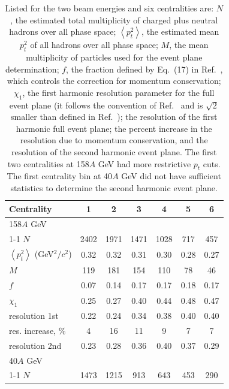 \documentclass[aps,prc,superscriptaddress,showpacs,floatfix,nofootinbib]{revtex4}
\newcommand{\mean}[1]{\left\langle #1 \right\rangle}
\begin{document}
\begin{table}[hbt!]
\caption {Listed for the two beam energies and six centralities are: 
$N$, the estimated total multiplicity of charged plus neutral hadrons
over all phase space; $\mean{p_t^2}$, the estimated mean $p_t^2$ of
all hadrons over all phase space; $M$, the mean multiplicity of
particles used for the event plane determination; $f$, the fraction
defined by Eq.~(17) in Ref.~\cite{Borghini:2002mv}, which controls the
correction for momentum conservation; $\chi_1$, the first harmonic
resolution parameter for the full event plane (it follows the
convention of Ref.~\cite{Ollitrault:ba} and is $\sqrt{2}$ smaller than
defined in Ref.~\cite{Poskanzer:1998yz}); the resolution of the first
harmonic full event plane; the percent increase in the resolution due
to momentum conservation, and the resolution of the second harmonic
event plane. The first two centralities at 158$A$ GeV had more
restrictive $p_t$ cuts. The first centrality bin at 40$A$ GeV did
not have sufficient statistics to determine the second harmonic event
plane.}
\begin{center}
\begin{ruledtabular}
\begin{tabular}{l|c|c|c|c|c|c}
Centrality              & 1     & 2     & 3     & 4     & 5     & 6     \\ \hline
158$A$ GeV              & & & & & & \\ \cline{1-1}
$N$                     & 2402  & 1971  & 1471  & 1028  & 717   & 457   \\
$\mean{p_t^2}$ (GeV$^2/c^2$)  
                        & 0.32  & 0.32  & 0.31  & 0.30  & 0.28  & 0.27  \\
$M$                     & 119   & 181   & 154   & 110   & 78    & 46    \\
$f$                     & 0.07  & 0.14  & 0.17  & 0.17  & 0.18  & 0.17  \\
$\chi_1$                & 0.25  & 0.27  & 0.40  & 0.44  & 0.48  & 0.47  \\
resolution 1st          & 0.22  & 0.24  & 0.34  & 0.38  & 0.40  & 0.40  \\
res. increase, \%       & 4     & 16    & 11    & 9     & 7     & 7   \\ 
resolution 2nd          & 0.23  & 0.28  & 0.36  & 0.40  & 0.37  & 0.29
\\ \hline
40$A$ GeV               & & & & & & \\ \cline{1-1}
$N$                     & 1473  & 1215  & 913   & 643   & 453   & 290   \\

\end{tabular}
\end{ruledtabular}
\end{center}
\end{table}
\end{document}
